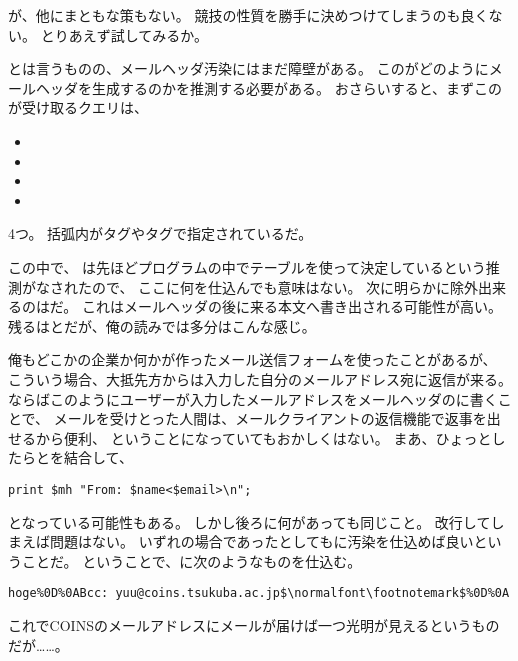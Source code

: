 が、他にまともな策もない。
競技の性質を勝手に決めつけてしまうのも良くない。
とりあえず試してみるか。

とは言うものの、メールヘッダ汚染にはまだ障壁がある。
このがどのようにメールヘッダを生成するのかを推測する必要がある。
おさらいすると、まずこのが受け取るクエリは、

\begin{itemize}
	\item {}
	\item {}
	\item {}
	\item {}
\end{itemize}

4つ。
括弧内がタグやタグで指定されているだ。

この中で、
は先ほどプログラムの中でテーブルを使って決定しているという推測がなされたので、
ここに何を仕込んでも意味はない。
次に明らかに除外出来るのはだ。
これはメールヘッダの後に来る本文へ書き出される可能性が高い。
残るはとだが、俺の読みでは多分はこんな感じ。



\columnbreak

俺もどこかの企業か何かが作ったメール送信フォームを使ったことがあるが、
こういう場合、大抵先方からは入力した自分のメールアドレス宛に返信が来る。
ならばこのようにユーザーが入力したメールアドレスをメールヘッダのに書くことで、
メールを受けとった人間は、メールクライアントの返信機能で返事を出せるから便利、
ということになっていてもおかしくはない。
まあ、ひょっとしたらとを結合して、

\begin{lstlisting}[style=perl, firstnumber=12]
print $mh "From: $name<$email>\n";
\end{lstlisting}

となっている可能性もある。
しかし後ろに何があっても同じこと。
改行してしまえば問題はない。
いずれの場合であったとしてもに汚染を仕込めば良いということだ。
ということで、に次のようなものを仕込む。

\begin{lstlisting}[mathescape]
hoge%0D%0ABcc: yuu@coins.tsukuba.ac.jp$\normalfont\footnotemark$%0D%0A
\end{lstlisting}

これでCOINSのメールアドレスにメールが届けば一つ光明が見えるというものだが……。




